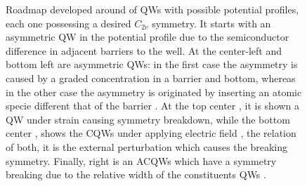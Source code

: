 \begin{figure}[ht!]
{%
Roadmap developed around of QWs with possible potential profiles, each one possessing a desired $C_{2v}$ symmetry. It starts with an asymmetric \gls{QW} \cite{koopmans1998microscopic,andrada1997spin}
in the potential profile due to the semiconductor difference in adjacent barriers to the well. At the center-left  and bottom left  are asymmetric QWs: in the first case the asymmetry \cite{english2013effect,eldridge2011spinorbit} is caused by a graded concentration in a barrier and bottom, whereas in the other case the asymmetry is originated by inserting an atomic specie different that of the barrier \cite{yu2015tuning}. At the top center , it is shown a QW under strain  \cite{english2011strain,tang2009well-width,li2019quantitative} causing symmetry breakdown, while the bottom center , shows the \gls{CQWs} under applying electric field \cite{kwok1992giant}, the relation of both, it is the external perturbation which causes the breaking symmetry. Finally, right  is an ACQWs which have a symmetry breaking due to the relative width of the constituents
QWs \cite{ruiz2021optical}. 
}
\label{fig:subsubsec:chapter-2-special-symmetry--roadmap}
\end{figure}
